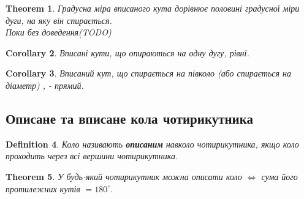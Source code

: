\documentclass[a4paper, 10pt]{article}
\theoremstyle{theoremdd}
\newtheorem{theorem}{Theorem}[subsection]
\theoremstyle{theoremdd}
\theoremstyle{theoremdd}
\newtheorem{definition}[theorem]{Definition}
\theoremstyle{theoremdd}
\theoremstyle{theoremdd}
\theoremstyle{theoremdd}
\theoremstyle{theoremdd}
\theoremstyle{theoremdd}
\theoremstyle{theoremdd}
\newtheorem{corollary}[theorem]{Corollary}
\begin{document}
\begin{theorem}
Градусна міра вписаного кута дорівнює половині градусної міри дуги, на яку він спирається.\\
\textit{Поки без доведення}(TODO)
\end{theorem}

\begin{corollary}
Вписані кути, що опираються на одну дугу, рівні.
\end{corollary}

\begin{corollary}
Вписаний кут, що спирається на півколо (або спирається на діаметр) , - прямий.
\end{corollary}

\subsection{Описане та вписане кола чотирикутника}
\begin{definition}
Коло називають \textbf{описаним} навколо чотирикутника, якщо коло проходить через всі вершини чотирикутника.
\begin{figure}[H]
\centering
{}
\end{figure}
\end{definition}

\begin{theorem}
У будь-який чотирикутник можна описати коло $\iff$ сума його протилежних кутів $= 180^\circ$.
\end{theorem}
\end{document}
